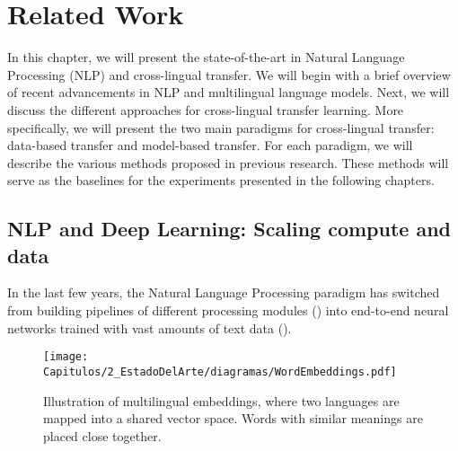 

\chapter[Related Work]{Related Work}
\label{ch:related-work}

In this chapter, we will present the state-of-the-art in Natural Language Processing (NLP) and cross-lingual transfer. We will begin with a brief overview of recent advancements in NLP and multilingual language models. Next, we will discuss the different approaches for cross-lingual transfer learning. More specifically, we will present the two main paradigms for cross-lingual transfer: data-based transfer and model-based transfer. For each paradigm, we will describe the various methods proposed in previous research. These methods will serve as the baselines for the experiments presented in the following chapters.


\section{NLP and Deep Learning: Scaling compute and data}
\label{sc:deep-learning-sota}


In the last few years, the Natural Language Processing paradigm has switched from building pipelines of different processing modules (\cite{DBLP:conf/lrec/AgerriBR14}) into end-to-end neural networks trained with vast amounts of text data (\cite{DBLP:journals/corr/abs-2111-01243}).

\begin{figure}[ht]
    \centering
    \texttt{[image: Capitulos/2\_EstadoDelArte/diagramas/WordEmbeddings.pdf]}
    \caption{Illustration of multilingual embeddings, where two languages are mapped into a shared vector space. Words with similar meanings are placed close together.}
    \label{fig:chap3_multilingual_embeddings}
\end{figure}


